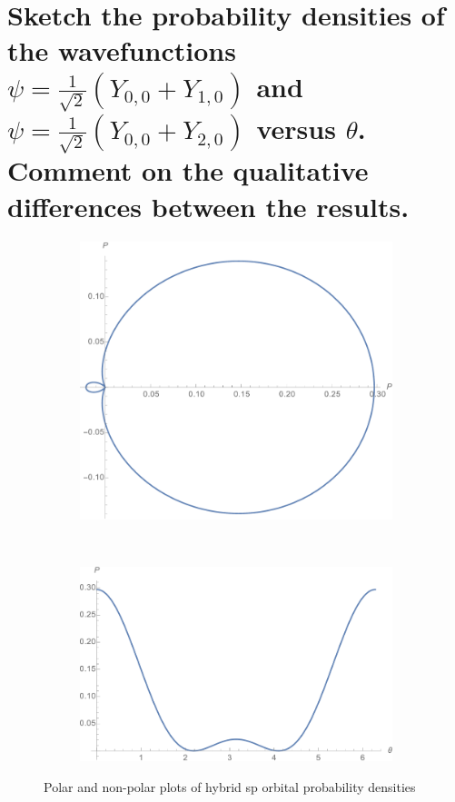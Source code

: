 \documentclass[a4paper]{scrartcl}
\begin{document}
\section{Sketch the probability densities of the wavefunctions \(\psi = \frac{1}{\sqrt{2}} (Y_{0, 0} + Y_{1, 0})\) and \(\psi = \frac{1}{\sqrt{2}} (Y_{0, 0} + Y_{2, 0})\) versus \(\theta\). Comment on the qualitative differences between the results.}
\begin{figure}[h]
    \centering
    \begin{subfigure}[b]{0.45\textwidth}
        \includegraphics[width = \textwidth]{orbital-sp-polar.png}
    \end{subfigure}
    ~
    \begin{subfigure}[b]{0.45\textwidth}
        \includegraphics[width = \textwidth]{orbital-sp.png}
    \end{subfigure}
    \caption{Polar and non-polar plots of hybrid sp orbital probability densities}
    \label{fig:orbital-sp}
\end{figure}
\end{document}

